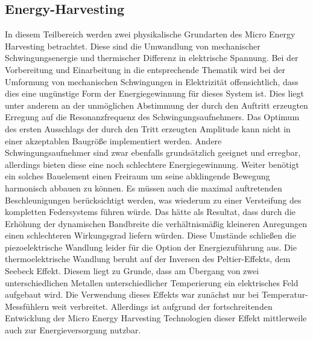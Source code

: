 \documentclass[12pt]{scrreprt} %
\begin{document}
\subsection{Energy-Harvesting}
\label{energy}
In diesem Teilbereich werden zwei physikalische Grundarten des Micro Energy Harvesting betrachtet. Diese sind die Umwandlung von mechanischer Schwingungsenergie und thermischer Differenz in elektrische Spannung. Bei der Vorbereitung und Einarbeitung in die entsprechende Thematik wird bei der Umformung von mechanischen Schwingungen in Elektrizität offensichtlich, dass dies eine ungünstige Form der Energiegewinnung für dieses System ist. Dies liegt unter anderem an der unmöglichen Abstimmung der durch den Auftritt erzeugten Erregung auf die Resonanzfrequenz des Schwingungsaufnehmers. Das Optimum des ersten Ausschlags der durch den Tritt erzeugten Amplitude kann nicht in einer akzeptablen Baugröße implementiert werden. Andere Schwingungsaufnehmer sind zwar ebenfalls grundsätzlich geeignet und erregbar, allerdings bieten diese eine noch schlechtere Energiegewinnung. Weiter benötigt ein solches Bauelement einen Freiraum um seine abklingende Bewegung harmonisch abbauen zu können. Es müssen auch die maximal auftretenden Beschleunigungen berücksichtigt werden, was wiederum zu einer Versteifung des kompletten Federsystems führen würde. Das hätte als Resultat, dass durch die Erhöhung der dynamischen Bandbreite die verhältnismäßig kleineren Anregungen einen schlechteren Wirkungsgrad liefern würden. Diese Umstände schließen die piezoelektrische Wandlung leider für die Option der Energiezuführung aus. \citep[vgl. S.39]{Dembowski2011} \newline 
Die thermoelektrische Wandlung beruht auf der Inversen des Peltier-Effekts, dem Seebeck Effekt. Diesem liegt zu Grunde, dass am Übergang von zwei unterschiedlichen Metallen unterschiedlicher Temperierung ein elektrisches Feld aufgebaut wird. Die Verwendung dieses Effekts war zunächst nur bei Temperatur-Messfühlern weit verbreitet. Allerdings ist aufgrund der fortschreitenden Entwicklung der Micro Energy Harvesting Technologien dieser Effekt mittlerweile auch zur Energieversorgung nutzbar. \newline \newline
\end{document}
